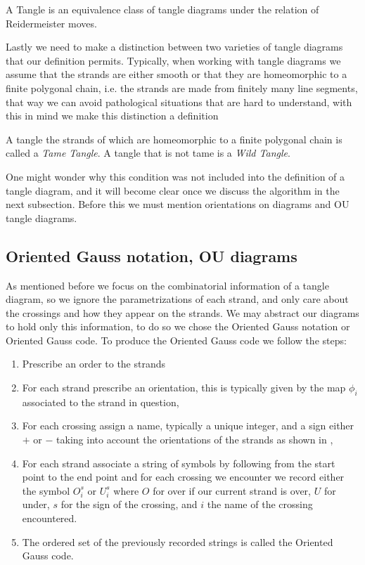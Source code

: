 \begin{definition}
A Tangle is an equivalence class of tangle diagrams under the relation of Reidermeister moves.
\end{definition}
Lastly we need to make a distinction between two varieties of tangle diagrams that our definition permits. Typically, when working with tangle diagrams we assume that the strands are either smooth or that they are homeomorphic to a finite polygonal chain, i.e. the strands are made from finitely many line segments, that way we can avoid pathological situations that are hard to understand, with this in mind we make this distinction a definition 

\begin{definition}
A tangle the strands of which are homeomorphic to a finite polygonal chain is called a \textit{Tame Tangle}. A tangle that is not tame is a \textit{Wild Tangle}.
\end{definition}

One might wonder why this condition was not included into the definition of a tangle diagram, and it will become clear once we discuss the algorithm in the next subsection. Before this we must mention orientations on diagrams and OU tangle diagrams.

\subsection{Oriented Gauss notation, OU diagrams}

As mentioned before we focus on the combinatorial information of a tangle diagram, so we ignore the parametrizations of each strand, and only care about the crossings and how they appear on the strands. We may abstract our diagrams to hold only this information, to do so we chose the Oriented Gauss notation or Oriented Gauss code. To produce the Oriented Gauss code we follow the steps:

\begin{enumerate}
\item Prescribe an order to the strands
\item For each strand prescribe an orientation, this is typically given by the map $\phi_i$ associated to the strand in question,
\item For each crossing assign a name, typically a unique integer, and a sign either $+$ or $-$ taking into account the orientations of the strands as shown in ,
\item For each strand associate a string of symbols by following from the start point to the end point and for each crossing we encounter we record either the symbol $O^s_i$ or $U^s_i$ where $O$ for over if our current strand is over, $U$ for under, $s$ for the sign of the crossing, and $i$ the name of the crossing encountered.
\item The ordered set of the previously recorded strings is called the Oriented Gauss code.
\end{enumerate}


